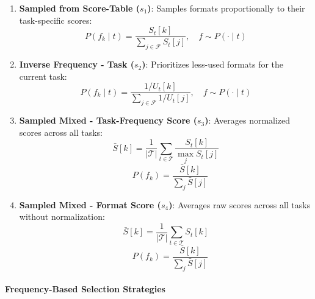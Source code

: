 \begin{enumerate}
    \item \textbf{Sampled from Score-Table ($s_1$)}: Samples formats proportionally to their task-specific scores:
    \begin{equation}
    P(f_k \mid t) = \frac{S_t[k]}{\sum_{j \in \mathcal{F}} S_t[j]}, \quad f \sim P(\cdot \mid t)
    \end{equation}
    
    \item \textbf{Inverse Frequency - Task ($s_2$)}: Prioritizes less-used formats for the current task:
    \begin{equation}
    P(f_k \mid t) = \frac{1/U_t[k]}{\sum_{j \in \mathcal{F}} 1/U_t[j]}, \quad f \sim P(\cdot \mid t)
    \end{equation}
    
    \item \textbf{Sampled Mixed - Task-Frequency Score ($s_3$)}: Averages normalized scores across all tasks:
    \begin{equation}
    \bar{S}[k] = \frac{1}{|\mathcal{T}|} \sum_{t \in \mathcal{T}} \frac{S_t[k]}{\max_{j} S_t[j]}
    \end{equation}
    \begin{equation}
    \quad P(f_k) = \frac{\bar{S}[k]}{\sum_{j} \bar{S}[j]}
    \end{equation}
    
    \item \textbf{Sampled Mixed - Format Score ($s_4$)}: Averages raw scores across all tasks without normalization:
    \begin{equation}
    \bar{S}[k] = \frac{1}{|\mathcal{T}|} \sum_{t \in \mathcal{T}} S_t[k]
    \end{equation}
    \begin{equation}
    \quad P(f_k) = \frac{\bar{S}[k]}{\sum_{j} \bar{S}[j]}
    \end{equation}
\end{enumerate}

\paragraph{Frequency-Based Selection Strategies}

